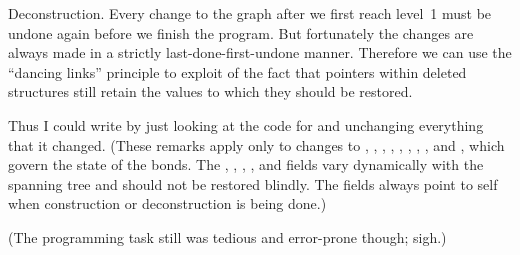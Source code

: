 Deconstruction. Every change to the graph after we
first reach level~1
must be undone again before we finish the program. But fortunately
the changes are always made in a strictly last-done-first-undone
manner. Therefore we can use the ``dancing links'' principle to
exploit of the fact that pointers within deleted structures
still retain the values to which they should be restored.

Thus I could write  by just looking at the code for 
and unchanging everything that it changed.
(These remarks apply only to changes
to , , , , ,
, , ,
and , which govern the state of the bonds. The , , ,
, and  fields vary dynamically with the spanning tree
and
should not be restored blindly. The  fields always point to self
when
construction or deconstruction is being done.)

(The programming task still was tedious and error-prone though; sigh.)

